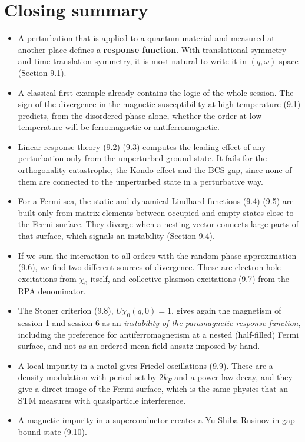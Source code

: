 \section{Closing summary}

\begin{itemize}
\item A perturbation that is applied to a quantum material and measured at another place defines a
  \textbf{response function}. With translational symmetry and time-translation symmetry, it is most
  natural to write it in $(q,\omega)$-space (Section 9.1).
\item A classical first example already contains the logic of the whole session. The sign of the
  divergence in the magnetic susceptibility at high temperature (9.1) predicts, from the disordered
  phase alone, whether the order at low temperature will be ferromagnetic or antiferromagnetic.
\item Linear response theory (9.2)-(9.3) computes the leading effect of any perturbation only from the
  unperturbed ground state. It fails for the orthogonality catastrophe, the Kondo effect and the BCS
  gap, since none of them are connected to the unperturbed state in a perturbative way.
\item For a Fermi sea, the static and dynamical Lindhard functions (9.4)-(9.5) are built only from
  matrix elements between occupied and empty states close to the Fermi surface. They diverge when a
  nesting vector connects large parts of that surface, which signals an instability (Section 9.4).
\item If we sum the interaction to all orders with the random phase approximation (9.6), we find two
  different sources of divergence. These are electron-hole excitations from $\chi_0$ itself, and
  collective plasmon excitations (9.7) from the RPA denominator.
\item The Stoner criterion (9.8), $U\chi_0(q,0)=1$, gives again the magnetism of session 1 and
  session 6 as an \emph{instability of the paramagnetic response function}, including the
  preference for antiferromagnetism at a nested (half-filled) Fermi surface, and not as an ordered
  mean-field ansatz imposed by hand.
\item A local impurity in a metal gives Friedel oscillations (9.9). These are a density modulation
  with period set by $2k_F$ and a power-law decay, and they give a direct image of the Fermi surface,
  which is the same physics that an STM measures with quasiparticle interference.
\item A magnetic impurity in a superconductor creates a Yu-Shiba-Rusinov in-gap bound state (9.10).

\end{itemize}
